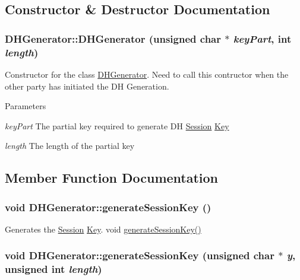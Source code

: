 \subsection{Constructor \& Destructor Documentation}
\hypertarget{classDHGenerator_aec089023908d2653236591a24a232551}{
\subsubsection[{DHGenerator}]{\setlength{\rightskip}{0pt plus 5cm}DHGenerator::DHGenerator (unsigned char $\ast$ {\em keyPart}, \/  int {\em length})}}
\label{classDHGenerator_aec089023908d2653236591a24a232551}


Constructor for the class \hyperlink{classDHGenerator}{DHGenerator}. Need to call this contructor when the other party has initiated the DH Generation. 
\begin{DoxyParams}{Parameters}
\item[{\em keyPart}]The partial key required to generate DH \hyperlink{classSession}{Session} \hyperlink{structKey}{Key} \item[{\em length}]The length of the partial key \end{DoxyParams}


\subsection{Member Function Documentation}
\hypertarget{classDHGenerator_a371955b43769de8f1b5b8f61031b659e}{
\subsubsection[{generateSessionKey}]{\setlength{\rightskip}{0pt plus 5cm}void DHGenerator::generateSessionKey ()}}
\label{classDHGenerator_a371955b43769de8f1b5b8f61031b659e}


Generates the \hyperlink{classSession}{Session} \hyperlink{structKey}{Key}. void \hyperlink{classDHGenerator_a371955b43769de8f1b5b8f61031b659e}{generateSessionKey()} \hypertarget{classDHGenerator_a9e52156b2bfe8a0aa95f111c07e50017}{
\subsubsection[{generateSessionKey}]{\setlength{\rightskip}{0pt plus 5cm}void DHGenerator::generateSessionKey (unsigned char $\ast$ {\em y}, \/  unsigned int {\em length})}}
\label{classDHGenerator_a9e52156b2bfe8a0aa95f111c07e50017}


